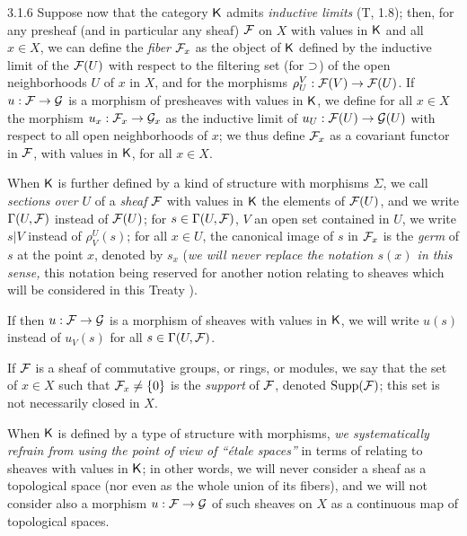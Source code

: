 \documentclass[../main.tex]{subfiles}
\begin{document}
\begin{env}{3.1.6}
Suppose now that the category $\mathsf{K}$ admits \emph{inductive limits} (T, 1.8);
then, for any presheaf (and in particular any sheaf) $\mathcal{F}$ on $X$ with
values in $\mathsf{K}$ and all $x\in X$, we can define the \emph{fiber} $\mathcal{F}_x$ as the object of $\mathsf{K}$ defined
by the inductive limit of the $\mathcal{F}(U)$ with respect to the filtering set
(for $\supset$) of the open neighborhoods $U$ of $x$ in $X$, and for the morphisms $\rho_U^V:\mathcal{F}(V)\to\mathcal{F}(U)$.
If $u:\mathcal{F}\to\mathcal{G}$ is a morphism of presheaves with values in $\mathsf{K}$, we define for all
$x\in X$ the morphism $u_x:\mathcal{F}_x\to\mathcal{G}_x$ as the inductive limit of $u_U:\mathcal{F}(U)\to\mathcal{G}(U)$ with respect to all
open neighborhoods of $x$; we thus define $\mathcal{F}_x$ as a covariant functor in $\mathcal{F}$, with values in $\mathsf{K}$, for
all $x\in X$.

When $\mathsf{K}$ is further defined by a kind of structure with morphisms $\Sigma$,
we call \emph{sections over $U$} of a \emph{sheaf} $\mathcal{F}$ with values in $\mathsf{K}$ the elements
of $\mathcal{F}(U)$, and we write $\Gamma(U,\mathcal{F})$ instead of $\mathcal{F}(U)$; for $s\in\Gamma(U,\mathcal{F})$, $V$ an open set
contained in $U$, we write $s|V$ instead of $\rho_V^U(s)$; for all $x\in U$, the canonical image
of $s$ in $\mathcal{F}_x$ is the \emph{germ} of $s$ at the point $x$, denoted by $s_x$ (\emph{we will never replace
the notation $s(x)$ in this sense,} this notation being reserved for another notion relating to sheaves
which will be considered in this Treaty ).

If then $u:\mathcal{F}\to\mathcal{G}$ is a morphism of sheaves with values in $\mathsf{K}$, we will write $u(s)$
instead of $u_V(s)$ for all $s\in\Gamma(U,\mathcal{F})$.

If $\mathcal{F}$ is a sheaf of commutative groups, or rings, or modules, we say
that the set of $x\in X$ such that $\mathcal{F}_x\neq\{0\}$ is the \emph{support} of $\mathcal{F}$, denoted
$\operatorname{Supp}(\mathcal{F})$; this set is not necessarily closed in $X$.

When $\mathsf{K}$ is defined by a type of structure with morphisms, \emph{we
systematically refrain from using the point of view of ``{\'e}tale spaces''} in terms of
relating to sheaves with values in $\mathsf{K}$; in other words, we will never consider
a sheaf as a topological space (nor even as the whole union of its
fibers), and we will not consider also a morphism $u:\mathcal{F}\to\mathcal{G}$ of such sheaves
on $X$ as a continuous map of topological spaces.
\end{env}
\end{document}
